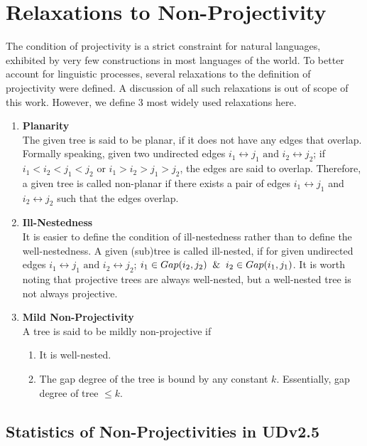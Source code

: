 \newpage
\section{Relaxations to Non-Projectivity}
\label{app:nonproj-relaxations}

The condition of projectivity is a strict constraint for natural languages, exhibited by very few constructions in most languages of the world. To better account for linguistic processes, several relaxations to the definition of projectivity were defined. A discussion of all such relaxations is out of scope of this work. However, we define 3 most widely used relaxations here.

\begin{enumerate}
    \item \textbf{Planarity}\\
    The given tree is said to be planar, if it does not have any edges that overlap. Formally speaking, given two undirected edges \(i_{1} \leftrightarrow j_{1} \text{ and } i_{2} \leftrightarrow j_{2}\); if \(i_{1} < i_{2} < j_{1} < j_{2}\) or \(i_{1} > i_{2} > j_{1} > j_{2}\), the edges are said to overlap.
    Therefore, a given tree is called non-planar if there exists a pair of edges \(i_{1} \leftrightarrow j_{1}\) and \(i_{2} \leftrightarrow j_{2}\) such that the edges overlap.
    \item \textbf{Ill-Nestedness}\\
    It is easier to define the condition of ill-nestedness rather than to define the well-nestedness. A given (sub)tree is called ill-nested, if for given undirected edges \(i_{1} \leftrightarrow j_{1} \text{ and } i_{2} \leftrightarrow j_{2}\); \(i_{1} \in Gap(i_{2},j_{2}) \And i_{2} \in Gap(i_{1},j_{1})\). It is worth noting that projective trees are always well-nested, but a well-nested tree is not always projective.
    \item \textbf{Mild Non-Projectivity}\\
    A tree is said to be mildly non-projective if
    \begin{enumerate}
        \item It is well-nested.
        \item The gap degree of the tree is bound by any constant \(k\). Essentially, gap degree of tree \(\leq k\).
    \end{enumerate}
\end{enumerate}

\subsection{Statistics of Non-Projectivities in UDv2.5}


